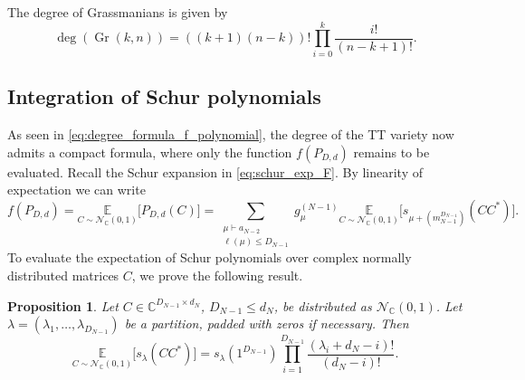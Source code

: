 \documentclass{article}
\newtheorem{proposition}[theorem]{Proposition}
\theoremstyle{definition}
\DeclareMathOperator{\Gr}{Gr}
\newcommand{\C}{\mathbb{C}}
\begin{document}
\vspace{-3mm}
\noindent
The degree of Grassmanians is given by \cite[Example 19.14]{harris_1992} 
\begin{equation}\label{eq:gr_degree}
    \deg(\Gr(k, n)) = ((k+1)(n-k))!\prod_{i=0}^{k}\frac{i!}{(n-k+1)!}.
\end{equation}

\subsection{Integration of Schur polynomials}
As seen in \eqref{eq:degree_formula_f_polynomial}, the degree of the TT variety now admits a compact formula, where only the function $f(P_{D,d})$ remains to be evaluated. Recall the Schur expansion in \eqref{eq:schur_exp_F}. By linearity of expectation we can write
\begin{equation}\label{eq:f_explicit}
    f(P_{D,d})=\underset{C \sim \mathcal N_{\C}(0,1)}{\mathbb{E}}\Big[P_{D,d}(C)\Big] = \sum_{\substack{\mu\vdash a_{N-2}\\ \ell(\mu)\le D_{N-1}}}
g_\mu^{(N-1)}\underset{C \sim \mathcal N_{\C}(0,1)}{\mathbb{E}}\Big[s_{\mu+(m_{N-1}^{D_{N-1}})}(CC^*)\Big].
\end{equation}
To evaluate the expectation of Schur polynomials over complex normally distributed matrices $C$, we prove the following result.
\begin{proposition}\label{prop:f_schur}
Let  \(C\in \mathbb C^{D_{N-1}\times d_N}\), \(D_{N-1}\le d_N\), be distributed as $\mathcal N_{\C}(0,1)$. Let
\(\lambda=(\lambda_1,\dots,\lambda_{D_{N-1}})\) be a partition, padded with zeros if
necessary. Then
\begin{equation*}
    \underset{C \sim \mathcal N_{\C}(0,1)}{\mathbb E}\Big[s_\lambda(CC^*)\Big]
=
s_\lambda(1^{D_{N-1}})
\prod_{i=1}^{D_{N-1}}
\frac{(\lambda_i+d_N-i)!}{(d_N-i)!}.
\end{equation*}
\end{proposition}
\end{document}
